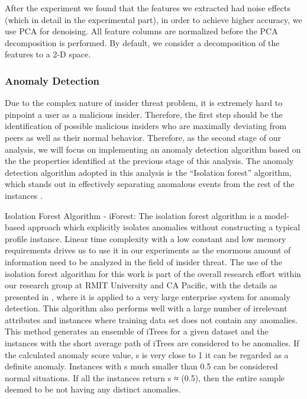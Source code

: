 \documentclass[conference]{IEEEtran}
\begin{document}
After the experiment we found that the features we extracted had noise effects (which in detail in the experimental part), in order to achieve higher accuracy, we use PCA\cite{b42} for denoising. All feature columns are normalized before the PCA decomposition is performed. By default, we consider a decomposition of the features to a 2-D space.

\subsubsection{Anomaly Detection}

Due to the complex nature of insider threat problem, it is extremely hard to pinpoint a user as a malicious insider. Therefore, the first step should be the identification of possible malicious insiders who are maximally deviating from peers as well as their normal behavior. Therefore, as the second stage of our analysis, we will focus on implementing an anomaly detection algorithm based on the the  properties identified at the previous stage of this analysis. The anomaly detection algorithm adopted in this analysis is the “Isolation forest” algorithm, which stands out in effectively separating anomalous events from the rest of the instances \cite{b43}.

Isolation Forest Algorithm - iForest: The isolation forest algorithm is a model-based approach which
explicitly isolates anomalies without constructing a typical profile instance. Linear time complexity with a low constant and low memory requirements drives us to use it in our experiments as the enormous amount of information need to be analyzed in the field of insider threat. The use of the isolation forest algorithm for this work is part of the overall research effort within our research group at RMIT University and CA Pacific, with the details as presented in \cite{b44}, where it is applied to a very large enterprise system for anomaly detection. This algorithm also performs well with a large number of irrelevant attributes and instances where training data set does not contain any anomalies. This method generates an ensemble of iTrees for a given dataset and the instances with the short average path of iTrees are considered to be anomalies. If the calculated anomaly score value, s is very close to 1 it can be regarded as a definite anomaly. Instances with s much smaller than 0.5 can be considered normal situations. If all the instances return s ≈ (0.5), then the entire sample deemed to be not having any distinct anomalies.
\end{document}
